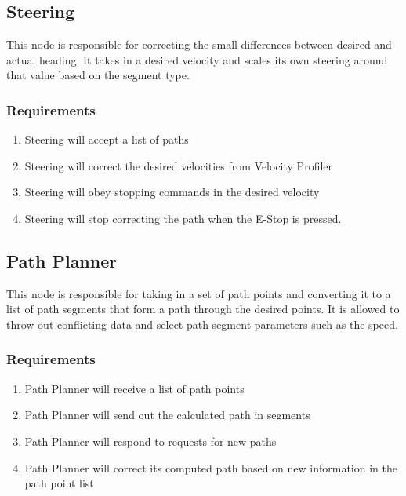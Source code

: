 \subsection{Steering}
  This node is responsible for correcting the small differences
  between desired and actual heading. It takes in a desired velocity and scales
  its own steering around that value based on the segment type.

  \subsubsection{Requirements}
  \begin{enumerate}
     \item Steering will accept a list of paths
     \item Steering will correct the desired velocities from Velocity
           Profiler
     \item Steering will obey stopping commands in the desired velocity
     \item Steering will stop correcting the path when the E-Stop is pressed.
  \end{enumerate}

\subsection{Path Planner}

This node is responsible for taking in a set of path points and converting it to a list of path segments that form a path through the desired points. It is allowed to throw out conflicting data and select path segment parameters such as the speed.

  \subsubsection{Requirements}
  \begin{enumerate}
    \item Path Planner will receive a list of path points
    \item Path Planner will send out the calculated path in segments
    \item Path Planner will respond to requests for new paths
    \item Path Planner will correct its computed path based on new information in the path point list
  \end{enumerate}


